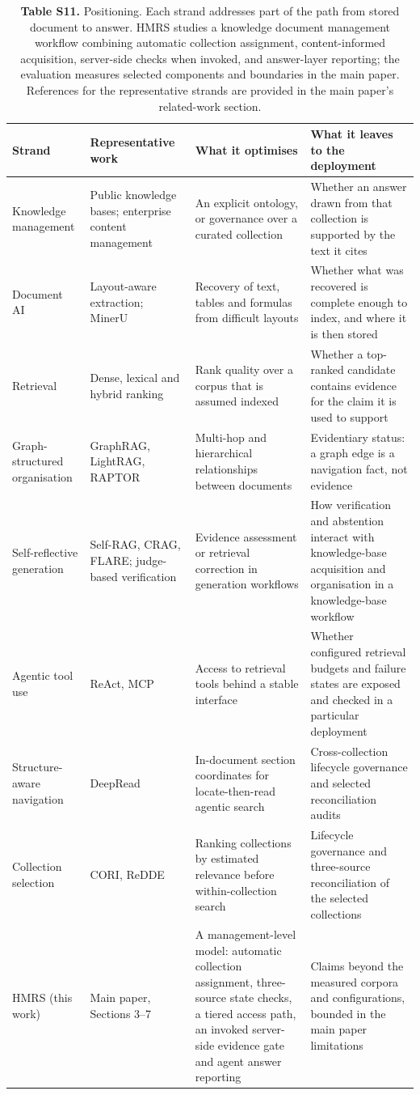 \begin{table}
\centering
\small
\setlength{\tabcolsep}{4pt}
\renewcommand{\arraystretch}{1.18}
\caption{\textbf{Table S11.} Positioning. Each strand addresses part of the path from stored
document to answer. HMRS studies a knowledge document management workflow
combining automatic collection assignment, content-informed acquisition,
server-side checks when invoked, and answer-layer reporting; the evaluation
measures selected components and boundaries in the main paper. References for
the representative strands are provided in the main paper's related-work section.}

\begin{tabular}{@{}p{2.392cm}p{4.702cm}p{3.960cm}p{3.960cm}@{}}
\toprule
Strand & Representative work & What it optimises & What it leaves to the deployment\\
\midrule
Knowledge management & Public knowledge bases; enterprise content management & An explicit ontology, or governance over a curated collection & Whether an answer drawn from that collection is supported by the text it cites\\
Document AI & Layout-aware extraction; MinerU & Recovery of text, tables and formulas from difficult layouts & Whether what was recovered is complete enough to index, and where it is then stored\\
Retrieval & Dense, lexical and hybrid ranking & Rank quality over a corpus that is assumed indexed & Whether a top-ranked candidate contains evidence for the claim it is used to support\\
Graph-structured organisation & GraphRAG, LightRAG, RAPTOR & Multi-hop and hierarchical relationships between documents & Evidentiary status: a graph edge is a navigation fact, not evidence\\
Self-reflective generation & Self-RAG, CRAG, FLARE; judge-based verification & Evidence assessment or retrieval correction in generation workflows & How verification and abstention interact with knowledge-base acquisition and organisation in a knowledge-base workflow\\
Agentic tool use & ReAct, MCP & Access to retrieval tools behind a stable interface & Whether configured retrieval budgets and failure states are exposed and checked in a particular deployment\\
Structure-aware navigation & DeepRead  & In-document section coordinates for locate-then-read agentic search & Cross-collection lifecycle governance and selected reconciliation audits\\
Collection selection & CORI, ReDDE & Ranking collections by estimated relevance before within-collection search & Lifecycle governance and three-source reconciliation of the selected collections\\
\midrule
HMRS (this work) & Main paper, Sections 3--7 & A management-level model: automatic collection assignment, three-source state checks, a tiered access path, an invoked server-side evidence gate and agent answer reporting & Claims beyond the measured corpora and configurations, bounded in the main paper limitations\\
\bottomrule
\end{tabular}
\end{table}
